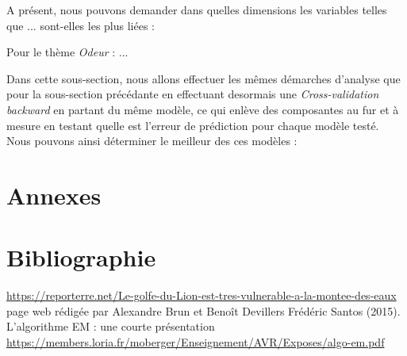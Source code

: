 \documentclass[a4paper,french,10pt]{article}
\begin{document}

A présent, nous pouvons demander dans quelles dimensions les variables telles que ... sont-elles les plus liées : 

Pour le thème \textit{Odeur} : 
...



Dans cette sous-section, nous allons effectuer les mêmes démarches d'analyse que pour la sous-section précédante en effectuant desormais une \textit{Cross-validation backward} en partant du même modèle, ce qui enlève des composantes au fur et à mesure en testant quelle est l’erreur de prédiction pour chaque modèle testé. Nous pouvons ainsi déterminer le meilleur des ces modèles : 


\newpage



\section{Annexes}
%

\newpage

\section{Bibliographie}

\renewcommand\refname{}
\begin{thebibliography}{9}
	\url{https://reporterre.net/Le-golfe-du-Lion-est-tres-vulnerable-a-la-montee-des-eaux}
	page web rédigée par Alexandre Brun et Benoît Devillers
	Frédéric Santos (2015). L'algorithme EM : une courte présentation
	\url{https://members.loria.fr/moberger/Enseignement/AVR/Exposes/algo-em.pdf}
\end{thebibliography}
\end{document}
